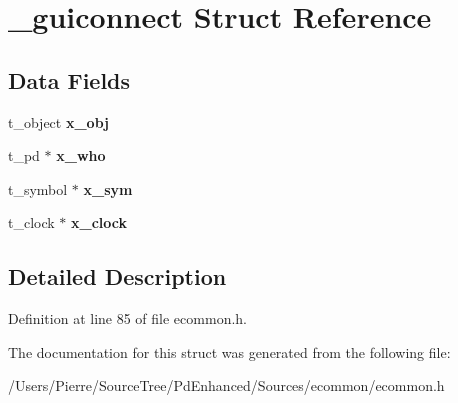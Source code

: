 \hypertarget{struct__guiconnect}{\section{\-\_\-guiconnect Struct Reference}
\label{struct__guiconnect}
}
\subsection*{Data Fields}
\begin{DoxyCompactItemize}
\item 
\hypertarget{struct__guiconnect_aec9b618f42517cd6740f1d37dba87d0a}{t\-\_\-object {\bfseries x\-\_\-obj}}\label{struct__guiconnect_aec9b618f42517cd6740f1d37dba87d0a}

\item 
\hypertarget{struct__guiconnect_abbd575f25ecf1fc4fc706f487f7bf433}{t\-\_\-pd $\ast$ {\bfseries x\-\_\-who}}\label{struct__guiconnect_abbd575f25ecf1fc4fc706f487f7bf433}

\item 
\hypertarget{struct__guiconnect_aac75f326262b21717e7625275550a9cc}{t\-\_\-symbol $\ast$ {\bfseries x\-\_\-sym}}\label{struct__guiconnect_aac75f326262b21717e7625275550a9cc}

\item 
\hypertarget{struct__guiconnect_a959680d1c5640f1e34e835dda3021eef}{t\-\_\-clock $\ast$ {\bfseries x\-\_\-clock}}\label{struct__guiconnect_a959680d1c5640f1e34e835dda3021eef}

\end{DoxyCompactItemize}


\subsection{Detailed Description}


Definition at line 85 of file ecommon.\-h.



The documentation for this struct was generated from the following file\-:\begin{DoxyCompactItemize}
\item 
/\-Users/\-Pierre/\-Source\-Tree/\-Pd\-Enhanced/\-Sources/ecommon/ecommon.\-h\end{DoxyCompactItemize}
